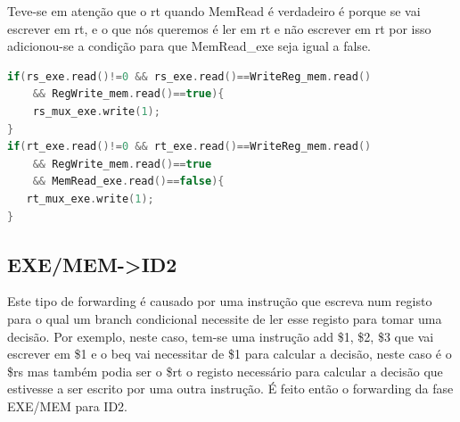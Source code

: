 \documentclass[pdftex,12pt,a4paper]{report}
\begin{document}
Teve-se em atenção que o rt quando MemRead é verdadeiro é porque se vai escrever em rt, e o que nós queremos é ler em rt e não escrever em rt por isso adicionou-se a condição para que MemRead\_exe seja igual a false.
\linebreak

\begin{lstlisting}[language=c]
if(rs_exe.read()!=0 && rs_exe.read()==WriteReg_mem.read() 
	&& RegWrite_mem.read()==true){
    rs_mux_exe.write(1); 
}
if(rt_exe.read()!=0 && rt_exe.read()==WriteReg_mem.read() 
	&& RegWrite_mem.read()==true 
	&& MemRead_exe.read()==false){
   rt_mux_exe.write(1);
}
\end{lstlisting} 

\subsection{EXE/MEM->ID2}

\begin{table}[!htb]
\centering
\label{table_exe_mem_id2}
\end{table}

Este tipo de forwarding é causado por uma instrução que escreva num registo para o qual um branch condicional necessite de ler esse registo para tomar uma decisão. Por exemplo, neste caso, tem-se uma instrução add \$1, \$2, \$3 que vai escrever em \$1 e o beq vai necessitar de \$1 para calcular a decisão, neste caso é o \$rs mas também podia ser o \$rt o registo necessário para calcular a decisão que estivesse a ser escrito por uma outra instrução. É feito então o forwarding da fase EXE/MEM para ID2.
\end{document}
